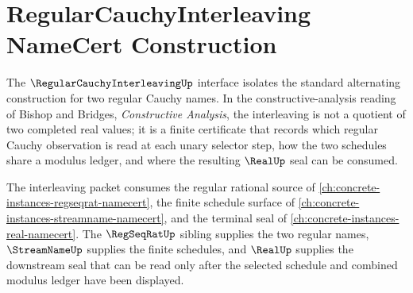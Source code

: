 \chapter{RegularCauchyInterleaving NameCert Construction}
\label{ch:concrete-instances-regularcauchyinterleaving-namecert}

The $\RegularCauchyInterleavingUp$ interface isolates the standard alternating construction for two regular Cauchy names. In the constructive-analysis reading of Bishop and Bridges, \emph{Constructive Analysis}, the interleaving is not a quotient of two completed real values; it is a finite certificate that records which regular Cauchy observation is read at each unary selector step, how the two schedules share a modulus ledger, and where the resulting $\RealUp$ seal can be consumed.

The interleaving packet consumes the regular rational source of \autoref{ch:concrete-instances-regseqrat-namecert}, the finite schedule surface of \autoref{ch:concrete-instances-streamname-namecert}, and the terminal seal of \autoref{ch:concrete-instances-real-namecert}. The $\RegSeqRatUp$ sibling supplies the two regular names, $\StreamNameUp$ supplies the finite schedules, and $\RealUp$ supplies the downstream seal that can be read only after the selected schedule and combined modulus ledger have been displayed.

